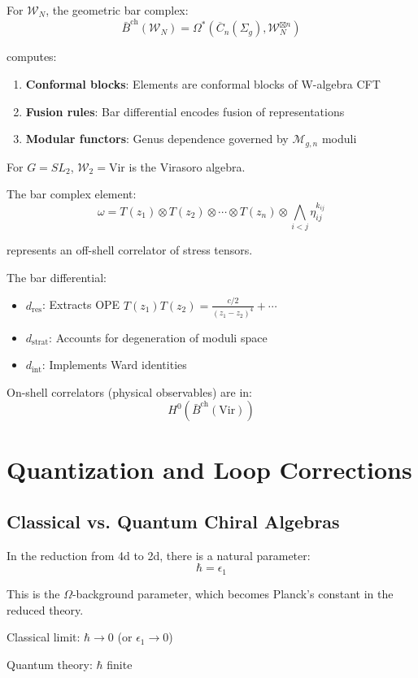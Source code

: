 \begin{theorem}
For $\mathcal{W}_N$, the geometric bar complex:
$$\bar{B}^{\text{ch}}(\mathcal{W}_N) = 
\Omega^*(\overline{C}_n(\Sigma_g), \mathcal{W}_N^{\boxtimes n})$$

computes:
\begin{enumerate}
\item \textbf{Conformal blocks}: Elements are conformal blocks of W-algebra CFT
\item \textbf{Fusion rules}: Bar differential encodes fusion of representations
\item \textbf{Modular functors}: Genus dependence governed by $\mathcal{M}_{g,n}$ 
moduli
\end{enumerate}
\end{theorem}

\begin{example}[Virasoro = $\mathcal{W}_2$]
For $G = SL_2$, $\mathcal{W}_2 = \text{Vir}$ is the Virasoro algebra.

The bar complex element:
$$\omega = T(z_1) \otimes T(z_2) \otimes \cdots \otimes T(z_n) \otimes 
\bigwedge_{i<j} \eta_{ij}^{k_{ij}}$$

represents an off-shell correlator of stress tensors.

The bar differential:
\begin{itemize}
\item $d_{\text{res}}$: Extracts OPE $T(z_1)T(z_2) = \frac{c/2}{(z_1-z_2)^4} + \cdots$
\item $d_{\text{strat}}$: Accounts for degeneration of moduli space
\item $d_{\text{int}}$: Implements Ward identities
\end{itemize}

On-shell correlators (physical observables) are in:
$$H^0(\bar{B}^{\text{ch}}(\text{Vir}))$$
\end{example}

\section{Quantization and Loop Corrections}

\subsection{Classical vs. Quantum Chiral Algebras}

\begin{definition}
In the reduction from 4d to 2d, there is a natural parameter:
$$\hbar = \epsilon_1$$

This is the $\Omega$-background parameter, which becomes Planck's constant in 
the reduced theory.

Classical limit: $\hbar \to 0$ (or $\epsilon_1 \to 0$)

Quantum theory: $\hbar$ finite
\end{definition}

